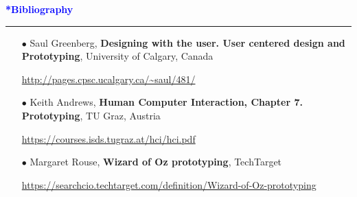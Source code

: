 \documentclass[pdf]{beamer}
\begin{document}
\begin{frame}
	\vspace{8mm}
	\textcolor{Blue}{\textbf{\Large{*Bibliography}}}
    \textcolor{red}{\rule{10cm}{1mm}}

        \begin{itemize}
        	\item[{$\bullet$}] Saul Greenberg, \textbf{Designing with the user. User centered design and Prototyping}, University of Calgary, Canada

        	\url{http://pages.cpsc.ucalgary.ca/~saul/481/}
        	\newline 
        	
        	\item[{$\bullet$}] Keith Andrews, \textbf{Human Computer Interaction, Chapter 7. Prototyping}, TU Graz, Austria

        	\url{https://courses.isds.tugraz.at/hci/hci.pdf}                			\newline
        		
        	\item[{$\bullet$}] Margaret Rouse, \textbf{Wizard of Oz prototyping}, TechTarget
        	
        	\url{https://searchcio.techtarget.com/definition/Wizard-of-Oz-prototyping}
        	\newline
        	
     	\end{itemize}
\end{frame}
\end{document}
